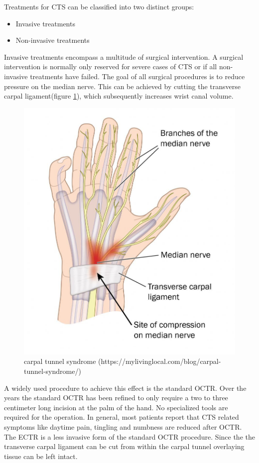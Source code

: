 Treatments for \gls{CTS} can be classified into two distinct groups:
\begin{itemize}
	\item Invasive treatments
	\item Non-invasive treatments
\end{itemize}
Invasive treatments encompass a multitude of surgical intervention.
A surgical intervention is normally only reserved for severe cases of \gls{CTS} or if all non-invasive treatments have failed\cite{scholten2007surgical}.
The goal of all surgical procedures is to reduce pressure on the median nerve.
This can be achieved by cutting the transverse carpal ligament(figure \ref{fig:carpal-tunnel-syndrome}), which subsequently increases wrist canal volume.
\begin{figure}
	\centering
	\includegraphics[width=0.6\linewidth]{figures/carpal-tunnel-syndrome}
	\caption{carpal tunnel syndrome (https://mylivinglocal.com/blog/carpal-tunnel-syndrome/)}
	\label{fig:carpal-tunnel-syndrome}
\end{figure}
A widely used procedure to achieve this effect is the standard \gls{OCTR}.
Over the years the standard \gls{OCTR} has been refined to only require a two to three centimeter long incision at the palm of the hand\cite{scholten2007surgical}.
No specialized tools are required for the operation.
In general, most patients report that \gls{CTS} related symptoms like daytime pain, tingling and numbness are reduced after \gls{OCTR}\cite{louie2013outcomes}.
The \gls{ECTR} is a less invasive form of the standard \gls{OCTR} procedure.
Since the the transverse carpal ligament can be cut from within the carpal tunnel overlaying tissue can be left intact.
